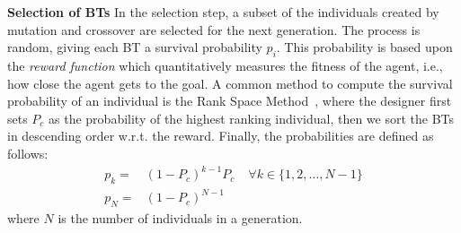\textbf{Selection of BTs}
In the selection step, a subset of the individuals created by mutation and crossover are selected for the next generation.
 The  process is  random,
giving each BT  a survival probability $p_i$. This probability is based upon  the \emph{reward function} which quantitatively measures the fitness of the agent, i.e., how close the agent gets to the goal. 
A common method to compute the survival probability of an individual is the Rank Space Method~\cite{mitchell1997machine},
where the designer first sets
 $P_c$ as the probability of the highest ranking individual, then we sort the BTs in  descending order w.r.t. the reward. Finally, the probabilities are defined as follows:
\begin{eqnarray}
p_k = &(1-P_c)^{k-1}P_c &\; \forall k \in \{1,2,\ldots,N-1 \} \\
p_N = &(1-P_c)^{N-1}&
\end{eqnarray}
where $N$ is the number of individuals in a generation.



